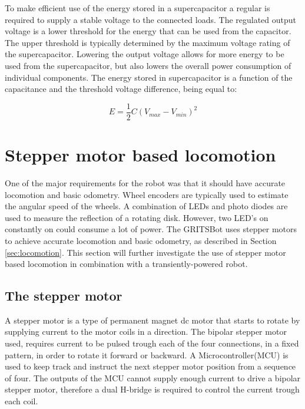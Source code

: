 To make efficient use of the energy stored in a supercapacitor a regular is required to supply a stable voltage to the connected loads.
The regulated output voltage is a lower threshold for the energy that can be used from the capacitor.
The upper threshold is typically determined by the maximum voltage rating of the supercapacitor.
Lowering the output voltage allows for more energy to be used from the supercapacitor, but also lowers the overall power consumption of individual components.
The energy stored in supercapacitor is a function of the capacitance and the threshold voltage difference, being equal to:

\begin{equation}
\label{eq:cap2}
E = \frac{1}{2}C(V_{max} - V_{min})^{2}
\end{equation}

\section{Stepper motor based locomotion}

One of the major requirements for the robot was that it should have accurate locomotion and basic odometry.
Wheel encoders are typically used to estimate the angular speed of the wheels.
A combination of LEDs and photo diodes are used to measure the reflection of a rotating disk.
However, two LED's on constantly on could consume a lot of power.
The GRITSBot uses stepper motors to achieve accurate locomotion and basic odometry, as described in Section \ref{sec:locomotion}.
This section will further investigate the use of stepper motor based locomotion in combination with a transiently-powered robot.

\subsection{The stepper motor}
A stepper motor is a type of permanent magnet dc motor that starts to rotate by supplying current to the motor coils in a direction.
The bipolar stepper motor used, requires current to be pulsed trough each of the four connections, in a fixed pattern, in order to rotate it forward or backward.
A Microcontroller(MCU) is used to keep track and instruct the next stepper motor position from a sequence of four.
The outputs of the MCU cannot supply enough current to drive a bipolar stepper motor, therefore a dual H-bridge is required to control the current trough each coil.

